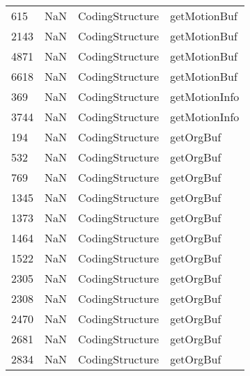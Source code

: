 \begin{tabular}{llll}
615  &                   NaN &            CodingStructure &                              getMotionBuf \\
2143 &                   NaN &            CodingStructure &                              getMotionBuf \\
4871 &                   NaN &            CodingStructure &                              getMotionBuf \\
6618 &                   NaN &            CodingStructure &                              getMotionBuf \\
369  &                   NaN &            CodingStructure &                             getMotionInfo \\
3744 &                   NaN &            CodingStructure &                             getMotionInfo \\
194  &                   NaN &            CodingStructure &                                 getOrgBuf \\
532  &                   NaN &            CodingStructure &                                 getOrgBuf \\
769  &                   NaN &            CodingStructure &                                 getOrgBuf \\
1345 &                   NaN &            CodingStructure &                                 getOrgBuf \\
1373 &                   NaN &            CodingStructure &                                 getOrgBuf \\
1464 &                   NaN &            CodingStructure &                                 getOrgBuf \\
1522 &                   NaN &            CodingStructure &                                 getOrgBuf \\
2305 &                   NaN &            CodingStructure &                                 getOrgBuf \\
2308 &                   NaN &            CodingStructure &                                 getOrgBuf \\
2470 &                   NaN &            CodingStructure &                                 getOrgBuf \\
2681 &                   NaN &            CodingStructure &                                 getOrgBuf \\
2834 &                   NaN &            CodingStructure &                                 getOrgBuf \\

\end{tabular}

